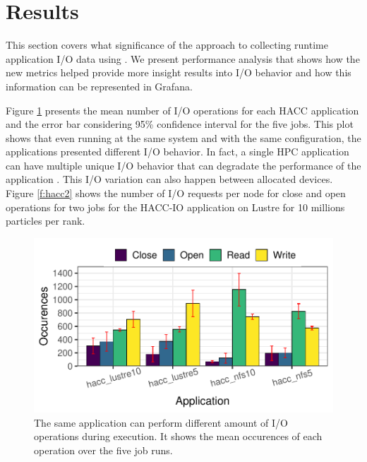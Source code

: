 \section{Results}
\label{sec:results}

This section covers what significance of the approach to collecting
runtime application I/O data using \Darshan. We present performance
analysis that shows how the new metrics helped provide more insight
results into I/O behavior and how this information can be represented
in Grafana.


Figure \ref{f:hacc} presents the mean number of I/O operations for
each HACC application and the error bar considering 95\% confidence
interval for the five jobs. This plot shows that even running at the
same system and with the same configuration, the applications
presented different I/O behavior. In fact, a single HPC application
can have multiple unique I/O behavior that can degradate the
performance of the application \cite{costa2021}. This I/O variation
can also happen between allocated devices. Figure \ref{f:hacc2} shows
the number of I/O requests per node for close and open operations for
two jobs for the HACC-IO application on Lustre for 10 millions
particles per rank.

\begin{figure}
	\centering
        \includegraphics[width=\linewidth]{figs/operations_hacc.pdf}
	\caption{The same application can perform different amount of
          I/O operations during execution. It shows the mean
          occurences of each operation over the five job runs.}
	\label{f:hacc}
\end{figure}

